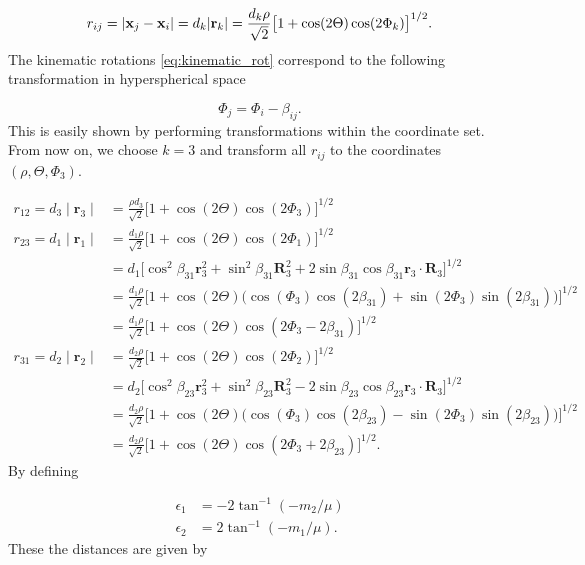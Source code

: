 \begin{equation}
r_{ij} = \lvert\mathbf{x}_j - \mathbf{x}_i\rvert = d_k \lvert\mathbf{r}_k\rvert = \frac{d_k\rho}{\sqrt{2}}\big[1 + \cos(2\Theta)\cos(2\Phi_k)\big]^{1/2}.
\end{equation}
The kinematic rotations \eqref{eq:kinematic_rot} correspond to the following transformation in hyperspherical space 

\begin{equation}
\Phi_j = \Phi_i-\beta_{ij}.
\end{equation}
This is easily shown by performing transformations within the coordinate set. From now on, we choose $k=3$ and transform all $r_{ij}$ to the coordinates $(\rho,\Theta,\Phi_3)$. 

\begin{equation}
\begin{aligned}
r_{12} = d_3 \mid\mathbf{r}_{3}\mid &= \frac{\rho d_3}{\sqrt{2}}\big[1+\cos(2\Theta)\cos(2\Phi_3)\big]^{1/2}\\
r_{23} = d_1 \mid\mathbf{r}_{1}\mid &= \frac{d_1\rho}{\sqrt{2}}\big[1 + \cos(2\Theta)\cos(2\Phi_1)\big]^{1/2}\\ 
&= d_1 \big[\cos^2\beta_{31}\mathbf{r}^2_{3} + \sin^2\beta_{31}\mathbf{R}^2_3 + 2\sin\beta_{31}\cos\beta_{31}\mathbf{r}_3\cdot\mathbf{R}_3\big]^{1/2}\\
&= \frac{d_1\rho}{\sqrt{2}} \big[1 + \cos(2\Theta)\big(\cos(\Phi_3)\cos(2\beta_{31}) + \sin(2\Phi_3)\sin(2\beta_{31})\big)\big]^{1/2}\\ 
&= \frac{d_1\rho}{\sqrt{2}}\big[1 + \cos(2\Theta)\cos(2\Phi_3 - 2\beta_{31})\big]^{1/2}\\ 
r_{31} = d_2 \mid\mathbf{r}_{2}\mid &= \frac{d_2\rho}{\sqrt{2}}\big[1 + \cos(2\Theta)\cos(2\Phi_2)\big]^{1/2} \\
&= d_2 \big[\cos^2\beta_{23}\mathbf{r}^2_{3} + \sin^2\beta_{23}\mathbf{R}^2_3 - 2\sin\beta_{23}\cos\beta_{23}\mathbf{r}_3\cdot\mathbf{R}_3\big]^{1/2}\\ 
&= \frac{d_2\rho}{\sqrt{2}} \big[1 + \cos(2\Theta)\big(\cos(\Phi_3)\cos(2\beta_{23}) - \sin(2\Phi_3)\sin(2\beta_{23})\big)\big]^{1/2}\\ 
&= \frac{d_2\rho}{\sqrt{2}}\big[1 + \cos(2\Theta)\cos(2\Phi_3 + 2\beta_{23})\big]^{1/2}.
\end{aligned}
\end{equation}
By defining

\begin{equation}
\begin{aligned}
\epsilon_1 &= -2\tan^{-1}(-m_2/\mu)\\
\epsilon_2 &= 2\tan^{-1}(-m_1/\mu).
\end{aligned}
\end{equation} 
These the distances are given by 


